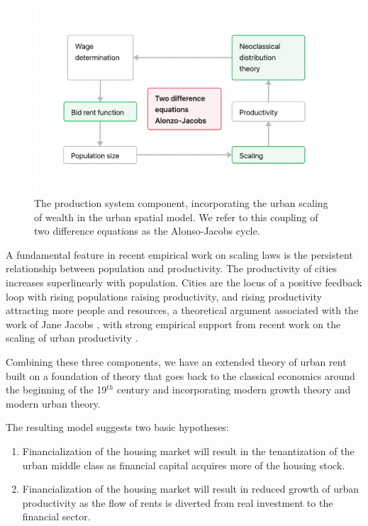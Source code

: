 \begin{figure}[!ht]
\centering
\includegraphics[scale=.7]{fig/flow-alonso-jacobs-cycle.png}
\caption[Production system.]{The production system component, incorporating the urban scaling of wealth in the urban spatial model. We refer to this coupling of two difference equations  as the Alonso-Jacobs cycle.}
\label{fig-alonso-jacobs-cycle}
\end{figure}

A fundamental feature in recent empirical work on scaling laws is the persistent relationship between population and productivity. The productivity of cities increases superlinearly with population. Cities are the locus of a positive feedback loop with rising populations raising productivity, and rising productivity attracting more people and resources, a theoretical argument associated with the work of Jane Jacobs \cite{jacobsEconomyCities1969}, with strong empirical support from recent work on the scaling of urban productivity  \cite{bettencourtGrowthInnovationScaling2007, bettencourtOriginsScalingCities2013, dongUnderstandingMesoscopicScaling2020, loboUrbanScalingProduction2013}.


Combining these three components, we have an extended theory of urban rent built on a foundation of theory that goes back to the \gls{classical economics} around the beginning of the 19$^{th}$ century and incorporating modern growth theory and modern urban theory. 

The resulting model suggests two basic hypotheses:
\begin{enumerate}
    \item Financialization of the housing market will result in the tenantization of the urban middle class as financial capital acquires more of the housing stock. %
    \item Financialization of the housing market will result in reduced growth of urban productivity as the flow of rents is diverted from real investment to the financial sector.
\end{enumerate} 
 
